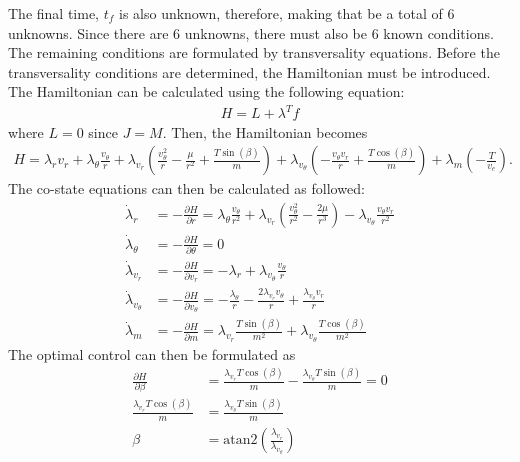 \documentclass[]{article}
\begin{document}
The final time, \(t_f\) is also unknown, therefore, making that be a total of 6 unknowns. Since there are 6 unknowns, there must also be 6 known conditions. The remaining conditions are formulated by transversality equations. Before the transversality conditions are determined, the Hamiltonian must be introduced. The Hamiltonian can be calculated using the following equation:
\begin{align}
	H = L + \lambda^{T}f
\end{align}
where \(L = 0\) since \(J = M\). Then, the Hamiltonian becomes
\begin{align*}
	H = \lambda_{r}v_r + \lambda_{\theta}\frac{v_\theta}{r} + \lambda_{v_r}(\frac{v^2_{\theta}}{r} - \frac{\mu}{r^2} + \frac{T\sin(\beta)}{m}) + \lambda_{v_\theta}(-\frac{v_{\theta}v_{r}}{r}   + \frac{T\cos(\beta)}{m}) +\lambda_m(-\frac{T}{v_e}).
\end{align*}
The co-state equations can then be calculated as followed:
\begin{align}
	\dot{\lambda}_r      &= -\frac{\partial{H}}{\partial{r}} = \lambda_\theta\frac{v_\theta}{r^2} + \lambda_{v_r}(\frac{v_{\theta}^2}{r^2} - \frac{2\mu}{r^3}) - \lambda_{v_\theta}\frac{v_{\theta}v_r}{r^2}
																																										  \label{lamdotr} \\
	\dot{\lambda}_\theta &= -\frac{\partial{H}}{\partial{\theta}} = 0                                                                                                     \label{lamdottheta} \\
	\dot{\lambda}_{v_r}  &=  -\frac{\partial{H}}{\partial{v_r}} = -\lambda_r + \lambda_{v_\theta}\frac{v_\theta}{r}                                                       \label{lamdotvr}    \\
	\dot{\lambda}_{v_\theta} &=  -\frac{\partial{H}}{\partial{v_\theta}} = -\frac{\lambda_\theta}{r} - \frac{2\lambda_{v_r}v_\theta}{r} + \frac{\lambda_{v_\theta}v_r}{r} \label{lamdotvtheta}\\
    \dot{\lambda}_m          &=  -\frac{\partial{H}}{\partial{m}} = \lambda_{v_r}\frac{T\sin(\beta)}{m^2} + \lambda_{v_\theta}\frac{T\cos(\beta)}{m^2}                      \label{lamdotm}
\end{align}
The optimal control can then be formulated as
\begin{align}
	\frac{\partial H}{\partial \beta} &= \frac{\lambda_{v_r}T\cos(\beta)}{m} - \frac{\lambda_{v_\theta}T\sin(\beta)}{m} = 0 \nonumber\\
	\frac{\lambda_{v_r}T\cos(\beta)}{m} &= \frac{\lambda_{v_\theta}T\sin(\beta)}{m} \nonumber\\
	\beta &= \mathrm{atan2}(\frac{\lambda_{v_r}}{\lambda_{v_\theta}}) \label{control}
\end{align}
\end{document}
